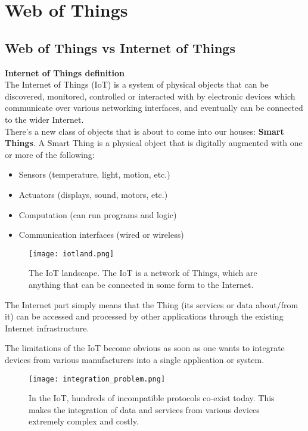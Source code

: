 \chapter{Web of Things}
\label{web-of-things}

\section{Web of Things vs Internet of Things}

\textbf{Internet of Things definition} \\

The Internet of Things (IoT) is a system of physical objects that can be
discovered, monitored, controlled or interacted with by electronic devices
which communicate over various networking interfaces, and eventually can be
connected to the wider Internet. \\

There's a new class of objects that is about to come into our houses:
\textbf{Smart Things}. A Smart Thing is a physical object that is digitally
augmented with one or more of the following:

\begin{itemize}
  \item Sensors (temperature, light, motion, etc.)
  \item Actuators (displays, sound, motors, etc.)
  \item Computation (can run programs and logic)
  \item Communication interfaces (wired or wireless)
\end{itemize}

\begin{figure}[H]
  \centering
  \texttt{[image: iotland.png]}
  \caption{The IoT landscape. The IoT is a network of Things, which are
anything that can be connected in some form to the Internet.}
  \label{fig:iotland}
\end{figure}

The Internet part simply means that the Thing (its services or data about/from
it) can be accessed and processed by other applications through the existing
Internet infrastructure.

The limitations of the IoT become obvious as soon as one wants to integrate
devices from various manufacturers into a single application or system.

\begin{figure}[H]
  \centering
  \texttt{[image: integration\_problem.png]}
  \caption{In the IoT, hundreds of incompatible protocols co-exist today.
This makes the integration of data and services from various devices extremely
complex and costly.}
  \label{fig:integration_problem}
\end{figure}

